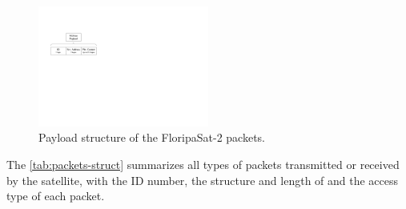 \begin{figure}[!ht]
    \begin{center}
        \includegraphics[width=0.5\textwidth]{figures/floripasat-packet-structure.pdf}
        \caption{Payload structure of the FloripaSat-2 packets.}
        \label{fig:fsat-pkt-structure}
    \end{center}
\end{figure}

The \autoref{tab:packets-struct} summarizes all types of packets transmitted or received by the satellite, with the ID number, the structure and length of and the access type of each packet.

